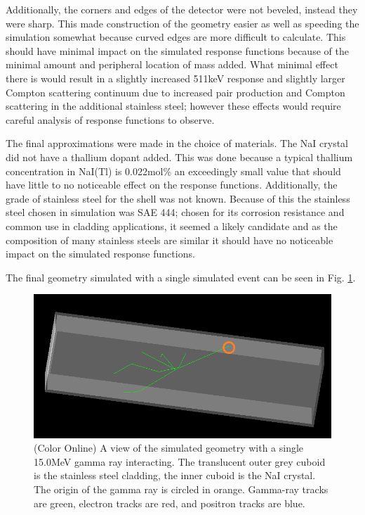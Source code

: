 \documentclass[5p]{elsarticle}
\begin{document}
Additionally, the corners and edges of the detector were not beveled, instead they were sharp. This made construction of the geometry easier as well as speeding the simulation somewhat because curved edges are more difficult to calculate. This should have minimal impact on the simulated response functions because of the minimal amount and peripheral location of mass added. What minimal effect there is would result in a slightly increased 511keV response and slightly larger Compton scattering continuum due to increased pair production and Compton scattering in the additional stainless steel; however these effects would require careful analysis of response functions to observe.

The final approximations were made in the choice of materials. The NaI crystal did not have a thallium dopant added. This was done because a typical thallium concentration in NaI(Tl) is 0.022mol\% an exceedingly small value that should have little to no noticeable effect on the response functions. Additionally, the grade of stainless steel for the shell was not known. Because of this the stainless steel chosen in simulation was SAE 444; chosen for its corrosion resistance and common use in cladding applications, it seemed a likely candidate and as the composition of many stainless steels are similar it should have no noticeable impact on the simulated response functions.

The final geometry simulated with a single simulated event can be seen in Fig. \ref{fig-det-geom-sim}.
\begin{figure}[h]
\begin{center}
\includegraphics[width=\linewidth]{geometry}
\caption{(Color Online) A view of the simulated geometry with a single 15.0MeV gamma ray interacting. The translucent outer grey cuboid is the stainless steel cladding, the inner cuboid is the NaI crystal. The origin of the gamma ray is circled in orange. Gamma-ray tracks are green, electron tracks are red, and positron tracks are blue.}
\label{fig-det-geom-sim}
\end{center}
\end{figure}
\end{document}
